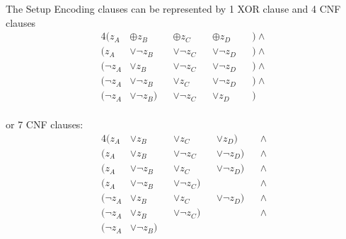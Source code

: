 The Setup Encoding clauses can be represented by 1 XOR clause and 4 CNF clauses
\begin{alignat*}{4}
  (z_A      & \oplus    z_B & & \oplus    z_C & & \oplus    z_D & & ) \land \\
  (z_A      & \lor \neg z_B & & \lor \neg z_C & & \lor \neg z_D & & ) \land \\
  (\neg z_A & \lor      z_B & & \lor \neg z_C & & \lor \neg z_D & & ) \land \\
  (\neg z_A & \lor \neg z_B & & \lor      z_C & & \lor \neg z_D & & ) \land \\
  (\neg z_A & \lor \neg z_B)& & \lor \neg z_C & & \lor      z_D & & ) \\
\end{alignat*}

or 7 CNF clauses:
\begin{alignat*}{4}
  (z_A & \lor           z_B & & \lor z_C       & & \lor z_D)      & & \land \\
  (z_A & \lor           z_B & & \lor \neg z_C  & & \lor \neg z_D) & & \land \\
  (z_A & \lor \neg      z_B & & \lor z_C       & & \lor \neg z_D) & & \land \\
  (z_A & \lor \neg      z_B & & \lor \neg z_C) & &                & & \land \\
  (\neg z_A & \lor      z_B & & \lor z_C       & & \lor \neg z_D) & & \land \\
  (\neg z_A & \lor      z_B & & \lor \neg z_C) & &                & & \land \\
  (\neg z_A & \lor \neg z_B) & &               & &                & & \\
\end{alignat*}

